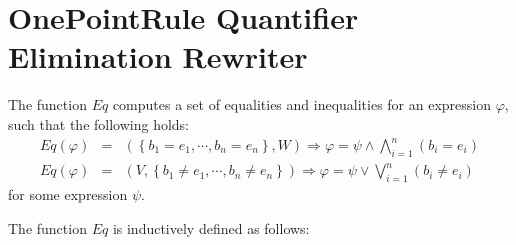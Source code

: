 \documentclass{article}
\begin{document}
\section{OnePointRule Quantifier Elimination Rewriter}

The function $Eq$ computes a set of equalities and inequalities for an
expression $\varphi $, such that the following holds:%
\begin{eqnarray*}
Eq\left( \varphi \right)  &=&\left( \left\{ b_{1}=e_{1},\cdots
,b_{n}=e_{n}\right\} ,W\right) \Rightarrow \varphi =\psi \wedge
\bigwedge\limits_{i=1}^{n}\left( b_{i}=e_{i}\right)  \\
Eq\left( \varphi \right)  &=&\left( V,\left\{ b_{1}\neq e_{1},\cdots
,b_{n}\neq e_{n}\right\} \right) \Rightarrow \varphi =\psi \vee
\bigvee\limits_{i=1}^{n}\left( b_{i}\neq e_{i}\right)
\end{eqnarray*}%
for some expression $\psi $.

The function $Eq$ is inductively defined as follows:
\end{document}

